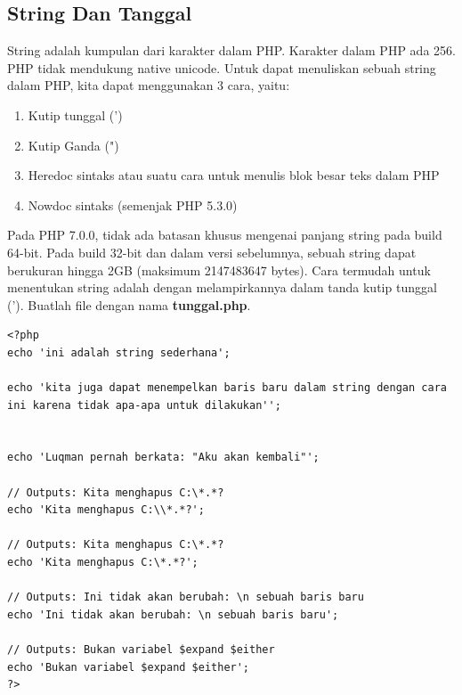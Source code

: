 \subsection{String Dan Tanggal}
String adalah kumpulan dari karakter dalam PHP. Karakter dalam PHP ada 256. PHP tidak mendukung native unicode. Untuk dapat menuliskan sebuah string dalam PHP, kita dapat menggunakan 3 cara, yaitu:
\begin{enumerate}
\item Kutip tunggal (')
\item Kutip Ganda (")
\item Heredoc sintaks atau suatu cara untuk menulis blok besar teks dalam PHP
\item Nowdoc sintaks (semenjak PHP 5.3.0)
\end{enumerate}
Pada PHP 7.0.0, tidak ada batasan khusus mengenai panjang string pada build 64-bit. Pada build 32-bit dan dalam versi sebelumnya, sebuah string dapat berukuran hingga 2GB (maksimum 2147483647 bytes). Cara termudah untuk menentukan string adalah dengan melampirkannya dalam tanda kutip tunggal ('). Buatlah file dengan nama \textbf{tunggal.php}.
\begin{lstlisting}
<?php
echo 'ini adalah string sederhana';

echo 'kita juga dapat menempelkan baris baru dalam string dengan cara ini karena tidak apa-apa untuk dilakukan'';


echo 'Luqman pernah berkata: "Aku akan kembali"';

// Outputs: Kita menghapus C:\*.*?
echo 'Kita menghapus C:\\*.*?';

// Outputs: Kita menghapus C:\*.*?
echo 'Kita menghapus C:\*.*?';

// Outputs: Ini tidak akan berubah: \n sebuah baris baru
echo 'Ini tidak akan berubah: \n sebuah baris baru';

// Outputs: Bukan variabel $expand $either
echo 'Bukan variabel $expand $either';
?>
\end{lstlisting}

